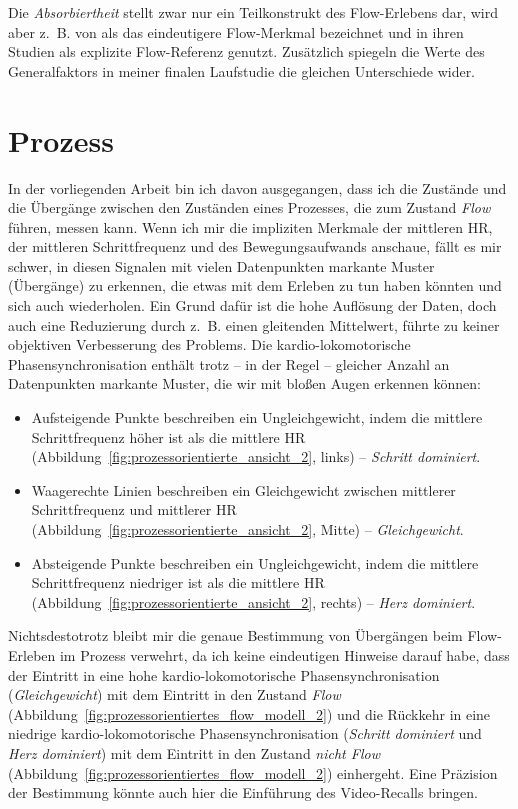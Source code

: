 Die \emph{Absorbiertheit} stellt zwar nur ein Teilkonstrukt des Flow-Erlebens dar, wird aber z.~B. von \citet{Peifer2015} als das eindeutigere Flow-Merkmal bezeichnet und in ihren Studien als explizite Flow-Referenz genutzt. Zusätzlich spiegeln die Werte des Generalfaktors in meiner finalen Laufstudie die gleichen Unterschiede wider. 

\section{Prozess} 

\label{sec:prozess}

In der vorliegenden Arbeit bin ich davon ausgegangen, dass ich die Zustände und die Übergänge zwischen den Zuständen eines Prozesses, die zum Zustand \emph{Flow} führen, messen kann. Wenn ich mir die impliziten Merkmale der mittleren \ac{HR}, der mittleren Schrittfrequenz und des Bewegungsaufwands anschaue, fällt es mir schwer, in diesen Signalen mit vielen Datenpunkten markante Muster (Übergänge) zu erkennen, die etwas mit dem Erleben zu tun haben könnten und sich auch wiederholen. Ein Grund dafür ist die hohe Auflösung der Daten, doch auch eine Reduzierung durch z.~B. einen gleitenden Mittelwert, führte zu keiner objektiven Verbesserung des Problems. Die kardio-lokomotorische Phasensynchronisation enthält trotz -- in der Regel -- gleicher Anzahl an Datenpunkten markante Muster, die wir mit bloßen Augen erkennen können: 
\begin{itemize}
	
	\item Aufsteigende Punkte beschreiben ein Ungleichgewicht, indem die mittlere Schrittfrequenz höher ist als die mittlere \ac{HR} (Abbildung~\ref{fig:prozessorientierte_ansicht_2}, links) -- \emph{Schritt dominiert}.
	
	\item Waagerechte Linien beschreiben ein Gleichgewicht zwischen mittlerer Schrittfrequenz und mittlerer \ac{HR} (Abbildung~\ref{fig:prozessorientierte_ansicht_2}, Mitte) -- \emph{Gleichgewicht}.
	
	\item Absteigende Punkte beschreiben ein Ungleichgewicht, indem die mittlere Schrittfrequenz niedriger ist als die mittlere \ac{HR} (Abbildung~\ref{fig:prozessorientierte_ansicht_2}, rechts) -- \emph{Herz dominiert}. 
\end{itemize}

Nichtsdestotrotz bleibt mir die genaue Bestimmung von Übergängen beim Flow-Erleben im Prozess verwehrt, da ich keine eindeutigen Hinweise darauf habe, dass der Eintritt in eine hohe kardio-lokomotorische Phasensynchronisation (\emph{Gleichgewicht}) mit dem Eintritt in den Zustand \emph{Flow} (Abbildung~\ref{fig:prozessorientiertes_flow_modell_2}) und die Rückkehr in eine niedrige kardio-lokomotorische Phasensynchronisation (\emph{Schritt dominiert} und \emph{Herz dominiert}) mit dem Eintritt in den Zustand \emph{nicht Flow} (Abbildung~\ref{fig:prozessorientiertes_flow_modell_2}) einhergeht. Eine Präzision der Bestimmung könnte auch hier die Einführung des Video-Recalls bringen.

